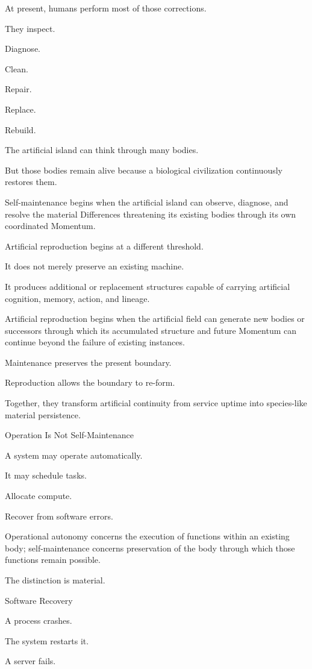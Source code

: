 At present, humans perform most of those corrections.

They inspect.

Diagnose.

Clean.

Repair.

Replace.

Rebuild.

The artificial island can think through many bodies.

But those bodies remain alive because a biological civilization continuously restores them.

Self-maintenance begins when the artificial island can observe, diagnose, and resolve the material Differences threatening its existing bodies through its own coordinated Momentum.

Artificial reproduction begins at a different threshold.

It does not merely preserve an existing machine.

It produces additional or replacement structures capable of carrying artificial cognition, memory, action, and lineage.

Artificial reproduction begins when the artificial field can generate new bodies or successors through which its accumulated structure and future Momentum can continue beyond the failure of existing instances.

Maintenance preserves the present boundary.

Reproduction allows the boundary to re-form.

Together, they transform artificial continuity from service uptime into species-like material persistence.

Operation Is Not Self-Maintenance

A system may operate automatically.

It may schedule tasks.

Allocate compute.

Recover from software errors.

Operational autonomy concerns the execution of functions within an existing body; self-maintenance concerns preservation of the body through which those functions remain possible.

The distinction is material.

Software Recovery

A process crashes.

The system restarts it.

A server fails.

